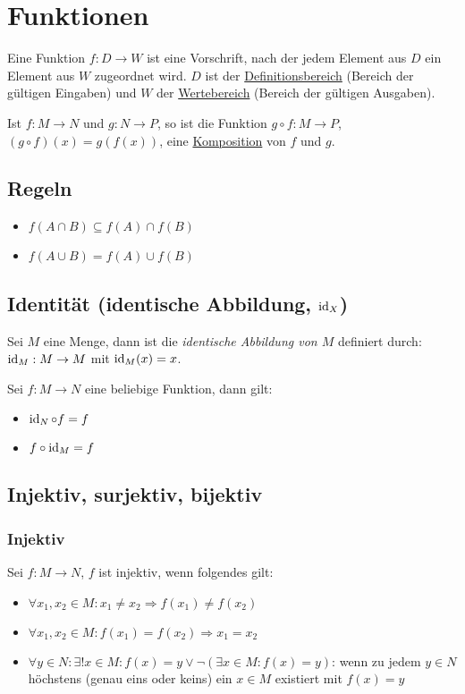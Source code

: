 \section{Funktionen}
Eine Funktion $f: D \rightarrow W$ ist eine Vorschrift, nach der jedem Element aus
$D$ ein Element aus $W$ zugeordnet wird. $D$ ist der \underline{Definitionsbereich}
(Bereich der gültigen Eingaben) und $W$ der \underline{Wertebereich}
(Bereich der gültigen Ausgaben).

Ist $f: M \rightarrow N$ und $g: N \rightarrow P$, so ist die Funktion $g \circ f: M \rightarrow P$,
$(g \circ f)(x) = g(f(x))$, eine \underline{Komposition} von $f$ und $g$.

\subsection{Regeln}
\begin{itemize}
	\item $f(A \cap B) \subseteq f(A) \cap f(B)$
	\item $f(A \cup B) = f(A) \cup f(B)$
\end{itemize}

\subsection{Identität (identische Abbildung, $\operatorname{id}_X$)}
Sei $M$ eine Menge, dann ist die \textit{identische Abbildung von $M$} definiert durch:
$\operatorname{id}_M: M \rightarrow M$ mit $\operatorname{id}_M(x) = x$.

Sei $f: M \rightarrow N$ eine beliebige Funktion, dann gilt:
\begin{itemize}
	\item $\operatorname{id}_N \circ f = f$
	\item $f \circ \operatorname{id}_M = f$
\end{itemize}

\subsection{Injektiv, surjektiv, bijektiv}
\subsubsection{Injektiv}
Sei $f: M \rightarrow N$, $f$ ist injektiv, wenn folgendes gilt:
\begin{itemize}
	\item $\forall x_1, x_2 \in M: x_1 \neq x_2 \Rightarrow f(x_1) \neq f(x_2)$
	\item $\forall x_1, x_2 \in M: f(x_1) = f(x_2) \Rightarrow x_1 = x_2$
	\item $\forall y \in N: \exists !x \in M: f(x) = y \lor \lnot(\exists x \in M: f(x) = y)$: wenn zu jedem $y \in N$ höchstens (genau eins oder keins) ein $x \in M$ existiert mit $f(x) = y$
\end{itemize}

